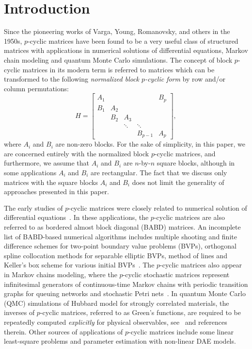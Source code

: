 \documentclass{llncs}
\begin{document}
\section{Introduction}

Since the pioneering works of
Varga, Young, Romanovsky, and others in the 1950s, %
$p$-cyclic matrices
have been found to be a very useful class of structured matrices
with applications in numerical solutions of differential equations, 
Markov chain modeling and quantum Monte Carlo simulations. 
The concept of block $p$-cyclic matrices
in its modern term is referred to matrices which can be
transformed to the following \emph{normalized block $p$-cyclic form} 
by row and/or column permutations: 
\begin{equation} \label{eq:matr_A}
  H =
  \begin{bmatrix}
    A_1 &    &    &  & B_p   \\
    B_1 & A_2 &    &  &  \\
        & B_2 & A_3 &  &     \\
            &        & \ddots & \ddots &         \\
        &     &          & B_{p-1} & A_p
  \end{bmatrix}
  ,
\end{equation}
where $A_i$ and $B_i$ are non-zero blocks.
For the sake of simplicity, in this paper,
we are concerned entirely with the {normalized block $p$-cyclic matrices},
and furthermore, we assume that 
$A_i$ and $B_i$ are $n$-by-$n$ square blocks, although
in some applications $A_i$ and $B_i$ are rectangular.
The fact that we discuss only matrices with the square blocks $A_i$ and $B_i$
does not limit the generality of approaches presented in this paper.

The early studies of $p$-cyclic matrices 
were closely related to numerical solution of differential 
equations~\cite{Wright93,Wright92BSOF,Fairweather04}.
In these applications, the $p$-cyclic matrices are also 
referred to as bordered almost block diagonal 
(BABD) matrices.  An incomplete list of 
BABD-based numerical algorithms includes multiple shooting 
and finite difference schemes for two-point boundary value problems (BVPs),
orthogonal spline collocation methods for separable elliptic BVPs, 
method of lines and Keller's box scheme for various initial 
BVPs~\cite{Wright92BSOF,Fairweather04}.
%
The $p$-cyclic matrices also appear in 
Markov chains modeling, where the $p$-cyclic stochastic 
matrices represent infinitesimal generators of continuous-time 
Markov chains with periodic transition graphs for queuing networks 
and stochastic Petri nets~\cite{Ernst00}. %
%
In quantum Monte Carlo (QMC) simulations of Hubbard model for
strongly correlated materials,
the inverses of $p$-cyclic matrices, referred to as Green's functions, 
are required to be repeatedly computed {\em explicitly} for 
physical observables, see~\cite{Bai09,Tomas12} and references therein. %
Other sources of applications of $p$-cyclic matrices include
some linear least-square problems and parameter estimation with 
non-linear DAE models.
\end{document}
